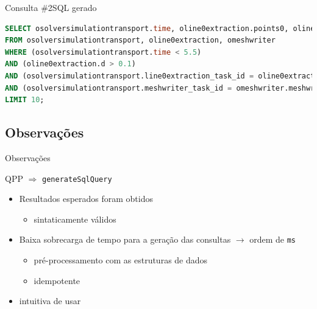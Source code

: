 \documentclass[12pt,compress,final]{beamer}
\begin{document}

\begin{frame}[fragile]{Consulta \#2}{SQL gerado}

\vspace{-1.5cm}

\begin{lstlisting}[language=sql,deletendkeywords={TIME},caption={tempo médio da geração: 15,45~ms}]
SELECT osolversimulationtransport.time, oline0extraction.points0, oline0extraction.points1, oline0extraction.points2, oline0extraction.d
FROM osolversimulationtransport, oline0extraction, omeshwriter
WHERE (osolversimulationtransport.time < 5.5)
AND (oline0extraction.d > 0.1)
AND (osolversimulationtransport.line0extraction_task_id = oline0extraction.line0extraction_task_id)
AND (osolversimulationtransport.meshwriter_task_id = omeshwriter.meshwriter_task_id)
LIMIT 10;
\end{lstlisting}

\end{frame}


\subsection*{Observações}
\begin{frame}{Observações}

\begin{block}{QPP $\Rightarrow$ \texttt{generateSqlQuery}}
\begin{itemize}
\item[\checkmark] Resultados esperados foram obtidos
\begin{itemize}
\item[\checkmark] sintaticamente válidos
\end{itemize}
\item[\checkmark] Baixa sobrecarga de tempo para a geração das consultas $\rightarrow$ ordem de \texttt{ms}
\begin{itemize}
\item[\checkmark] pré-processamento com as estruturas de dados %
\item[\checkmark] idempotente
\end{itemize}
\item[\checkmark] intuitiva de usar
\end{itemize}
\end{block}

\end{frame}
\end{document}

